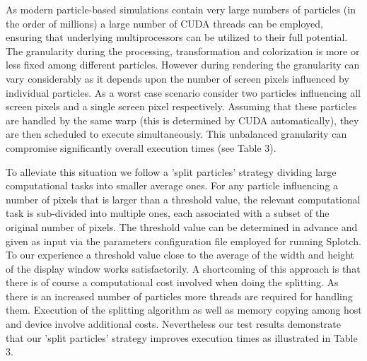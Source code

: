 As modern particle-based simulations contain very large numbers of particles 
(in the order of millions) a large number of CUDA threads can be employed, 
ensuring that underlying multiprocessors can be utilized to their full potential. 
The granularity during the processing, transformation and colorization is more or 
less fixed among different particles. However during rendering the granularity 
can vary considerably as it depends upon the number of screen pixels influenced 
by individual particles. As a worst case scenario consider two particles influencing 
all screen pixels and a single screen pixel respectively. Assuming that these 
particles are handled by the same warp (this is determined by CUDA automatically), 
they are then scheduled to execute simultaneously. This unbalanced granularity 
can compromise significantly overall execution times (see Table 3).


To alleviate this situation we follow a 'split particles' strategy 
dividing large computational tasks into smaller average ones.  For any particle 
influencing a number of pixels that is larger than a threshold value, the relevant 
computational task is sub-divided into multiple ones, each associated with a subset 
of the original number of pixels. The threshold value 
can be determined in advance and given as input via the parameters configuration 
file employed for running Splotch. To our experience a threshold value close to 
the average of the width and height of the display window works satisfactorily. 
A shortcoming of this approach is that there is of course a computational cost 
involved when doing the splitting. As there is an increased number of particles 
more threads are required for handling them. Execution of the splitting algorithm 
as well as memory copying among host and device involve additional costs. 
Nevertheless our test results demonstrate that our 'split particles' strategy 
improves execution times as illustrated in Table 3.

